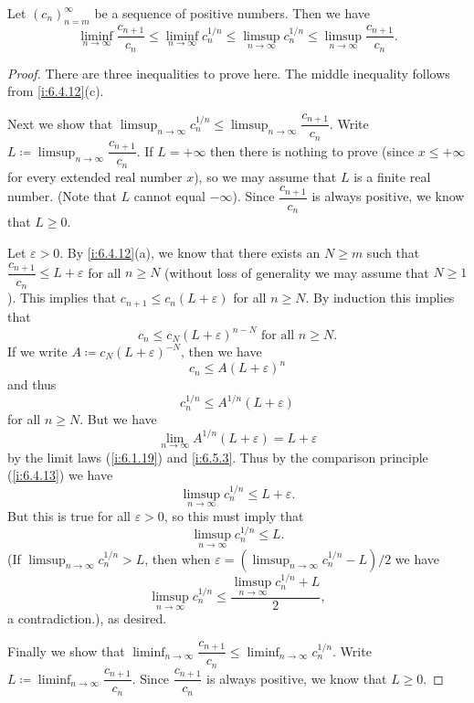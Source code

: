 \begin{lem}\label{i:7.5.2}
  Let \((c_n)_{n = m}^\infty\) be a sequence of positive numbers.
  Then we have
  \[
    \liminf_{n \to \infty} \dfrac{c_{n + 1}}{c_n} \leq \liminf_{n \to \infty} c_n^{1 / n} \leq \limsup_{n \to \infty} c_n^{1 / n} \leq \limsup_{n \to \infty} \dfrac{c_{n + 1}}{c_n}.
  \]
\end{lem}

\begin{proof}
  There are three inequalities to prove here.
  The middle inequality follows from \cref{i:6.4.12}(c).

  Next we show that \(\limsup_{n \to \infty} c_n^{1 / n} \leq \limsup_{n \to \infty} \dfrac{c_{n + 1}}{c_n}\).
  Write \(L \coloneqq \limsup_{n \to \infty} \dfrac{c_{n + 1}}{c_n}\).
  If \(L = +\infty\) then there is nothing to prove (since \(x \leq +\infty\) for every extended real number \(x\)), so we may assume that \(L\) is a finite real number.
  (Note that \(L\) cannot equal \(-\infty\)).
  Since \(\dfrac{c_{n + 1}}{c_n}\) is always positive, we know that \(L \geq 0\).

  Let \(\varepsilon > 0\).
  By \cref{i:6.4.12}(a), we know that there exists an \(N \geq m\) such that \(\dfrac{c_{n + 1}}{c_n} \leq L + \varepsilon\) for all \(n \geq N\)
  (without loss of generality we may assume that \(N \geq 1\)).
  This implies that \(c_{n + 1} \leq c_n (L + \varepsilon)\) for all \(n \geq N\).
  By induction this implies that
  \[
    c_n \leq c_N (L + \varepsilon)^{n - N} \text{ for all } n \geq N.
  \]
  If we write \(A \coloneqq c_N (L + \varepsilon)^{-N}\), then we have
  \[
    c_n \leq A(L + \varepsilon)^n
  \]
  and thus
  \[
    c_n^{1 / n} \leq A^{1 / n} (L + \varepsilon)
  \]
  for all \(n \geq N\).
  But we have
  \[
    \lim_{n \to \infty} A^{1 / n} (L + \varepsilon) = L + \varepsilon
  \]
  by the limit laws (\cref{i:6.1.19}) and \cref{i:6.5.3}.
  Thus by the comparison principle (\cref{i:6.4.13}) we have
  \[
    \limsup_{n \to \infty} c_n^{1 / n} \leq L + \varepsilon.
  \]
  But this is true for all \(\varepsilon > 0\), so this must imply that
  \[
    \limsup_{n \to \infty} c_n^{1 / n} \leq L.
  \]
  (If \(\limsup_{n \to \infty} c_n^{1 / n} > L\), then when \(\varepsilon = (\limsup_{n \to \infty} c_n^{1 / n} - L) / 2\) we have
  \[
    \limsup_{n \to \infty} c_n^{1 / n} \leq \dfrac{\limsup_{n \to \infty} c_n^{1 / n} + L}{2},
  \]
  a contradiction.), as desired.

  Finally we show that \(\liminf_{n \to \infty} \dfrac{c_{n + 1}}{c_n} \leq \liminf_{n \to \infty} c_n^{1 / n}\).
  Write \(L \coloneqq \liminf_{n \to \infty} \dfrac{c_{n + 1}}{c_n}\).
  Since \(\dfrac{c_{n + 1}}{c_n}\) is always positive, we know that \(L \geq 0\).


\end{proof}
